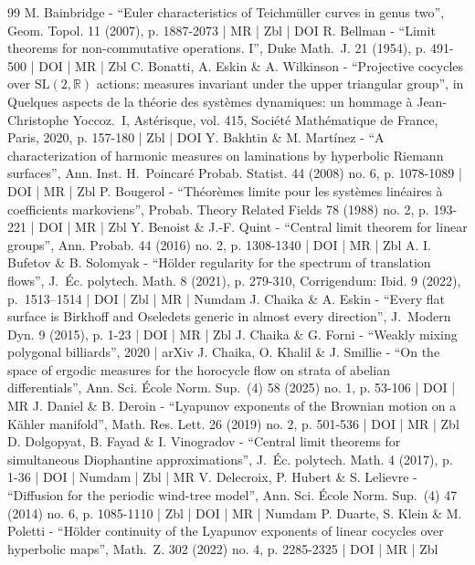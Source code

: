 \begin{thebibliography}{99}
M. Bainbridge - “Euler characteristics of Teichmüller curves in genus two”, Geom. Topol. 11 (2007), p. 1887-2073 | MR | Zbl | DOI
R. Bellman - “Limit theorems for non-commutative operations. I”, Duke Math. J. 21 (1954), p. 491-500 | DOI | MR | Zbl
C. Bonatti, A. Eskin \& A. Wilkinson - “Projective cocycles over $\mathrm{SL}(2,\mathbb{R})$ actions: measures invariant under the upper triangular group”, in Quelques aspects de la théorie des systèmes dynamiques: un hommage à Jean-Christophe Yoccoz. I, Astérisque, vol. 415, Société Mathématique de France, Paris, 2020, p. 157-180 | Zbl | DOI
Y. Bakhtin \& M. Martínez - “A characterization of harmonic measures on laminations by hyperbolic Riemann surfaces”, Ann. Inst. H. Poincaré Probab. Statist. 44 (2008) no. 6, p. 1078-1089 | DOI | MR | Zbl
P. Bougerol - “Théorèmes limite pour les systèmes linéaires à coefficients markoviens”, Probab. Theory Related Fields 78 (1988) no. 2, p. 193-221 | DOI | MR | Zbl
Y. Benoist \& J.-F. Quint - “Central limit theorem for linear groups”, Ann. Probab. 44 (2016) no. 2, p. 1308-1340 | DOI | MR | Zbl
A. I. Bufetov \& B. Solomyak - “Hölder regularity for the spectrum of translation flows”, J. Éc. polytech. Math. 8 (2021), p. 279-310, Corrigendum: Ibid. 9 (2022), p. 1513–1514 | DOI | Zbl | MR | Numdam
J. Chaika \& A. Eskin - “Every flat surface is Birkhoff and Oseledets generic in almost every direction”, J. Modern Dyn. 9 (2015), p. 1-23 | DOI | MR | Zbl
J. Chaika \& G. Forni - “Weakly mixing polygonal billiards”, 2020 | arXiv
J. Chaika, O. Khalil \& J. Smillie - “On the space of ergodic measures for the horocycle flow on strata of abelian differentials”, Ann. Sci. École Norm. Sup. (4) 58 (2025) no. 1, p. 53-106 | DOI | MR
J. Daniel \& B. Deroin - “Lyapunov exponents of the Brownian motion on a Kähler manifold”, Math. Res. Lett. 26 (2019) no. 2, p. 501-536 | DOI | MR | Zbl
D. Dolgopyat, B. Fayad \& I. Vinogradov - “Central limit theorems for simultaneous Diophantine approximations”, J. Éc. polytech. Math. 4 (2017), p. 1-36 | DOI | Numdam | Zbl | MR
V. Delecroix, P. Hubert \& S. Lelievre - “Diffusion for the periodic wind-tree model”, Ann. Sci. École Norm. Sup. (4) 47 (2014) no. 6, p. 1085-1110 | Zbl | DOI | MR | Numdam
P. Duarte, S. Klein \& M. Poletti - “Hölder continuity of the Lyapunov exponents of linear cocycles over hyperbolic maps”, Math. Z. 302 (2022) no. 4, p. 2285-2325 | DOI | MR | Zbl

\end{thebibliography}
